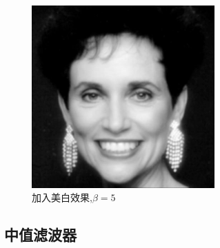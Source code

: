 \documentclass[11pt, a4paper, UTF8]{ctexart}
\begin{document}
\begin{figure}[H]
\begin{minipage}[t]{0.48\textwidth}
        \caption{$D_0 =100Hz$}
        \end{minipage}
      \begin{minipage}[t]{0.48\textwidth}
        \centering
        \includegraphics[width=7cm]{Gaus_log.jpg}
        \caption{加入美白效果,$\beta=5$}
        \end{minipage}
    \end{figure}

    \subsection{中值滤波器}
\end{document}
